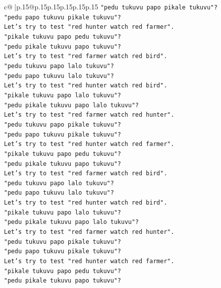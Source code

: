 \documentclass{article}
\begin{document}
{\begin{supertabular}{c@{$\;$}|p{.15\linewidth}@{}p{.15\linewidth}p{.15\linewidth}p{.15\linewidth}p{.15\linewidth}p{.15\linewidth}}
{{{\texttt{"pedu tukuvu papo pikale tukuvu"?} \\
\texttt{"pedu papo tukuvu pikale tukuvu"?} \\
\texttt{Let's try to test "red hunter watch red farmer".} \\
\texttt{"pikale tukuvu papo pedu tukuvu"?} \\
\texttt{"pedu pikale tukuvu papo tukuvu"?} \\
\texttt{Let's try to test "red farmer watch red bird".} \\
\texttt{"pedu tukuvu papo lalo tukuvu"?} \\
\texttt{"pedu papo tukuvu lalo tukuvu"?} \\
\texttt{Let's try to test "red hunter watch red bird".} \\
\texttt{"pikale tukuvu papo lalo tukuvu"?} \\
\texttt{"pedu pikale tukuvu papo lalo tukuvu"?} \\
\texttt{Let's try to test "red farmer watch red hunter".} \\
\texttt{"pedu tukuvu papo pikale tukuvu"?} \\
\texttt{"pedu papo tukuvu pikale tukuvu"?} \\
\texttt{Let's try to test "red hunter watch red farmer".} \\
\texttt{"pikale tukuvu papo pedu tukuvu"?} \\
\texttt{"pedu pikale tukuvu papo tukuvu"?} \\
\texttt{Let's try to test "red farmer watch red bird".} \\
\texttt{"pedu tukuvu papo lalo tukuvu"?} \\
\texttt{"pedu papo tukuvu lalo tukuvu"?} \\
\texttt{Let's try to test "red hunter watch red bird".} \\
\texttt{"pikale tukuvu papo lalo tukuvu"?} \\
\texttt{"pedu pikale tukuvu papo lalo tukuvu"?} \\
\texttt{Let's try to test "red farmer watch red hunter".} \\
\texttt{"pedu tukuvu papo pikale tukuvu"?} \\
\texttt{"pedu papo tukuvu pikale tukuvu"?} \\
\texttt{Let's try to test "red hunter watch red farmer".} \\
\texttt{"pikale tukuvu papo pedu tukuvu"?} \\
\texttt{"pedu pikale tukuvu papo tukuvu"?} \\
}}}
\end{supertabular}}
\end{document}
